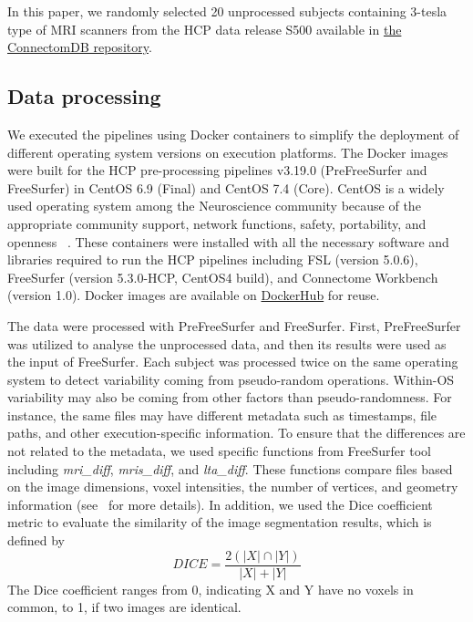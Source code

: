 \documentclass[a4paper,num-refs]{oup-contemporary}
\begin{document}
In this paper, we randomly selected 20 unprocessed subjects 
containing 3-tesla type of MRI scanners from the HCP data release S500 
available in \href{https://db.humanconnectome.org}{the ConnectomDB repository}. 


\subsection{Data processing}

We executed the pipelines using Docker containers to simplify the 
deployment of different operating system versions on execution 
platforms. 
The Docker images were built for the HCP pre-processing 
pipelines v3.19.0 (PreFreeSurfer and FreeSurfer) in 
CentOS 6.9 (Final) and CentOS 7.4 (Core). 
CentOS is a widely used operating system among the Neuroscience community because of 
the appropriate community support, network functions, safety, portability, and openness
~\cite{hanke2011neuroscience}.
These containers were installed with all the necessary software and libraries 
required to run the HCP pipelines including FSL (version 5.0.6), 
FreeSurfer (version 5.3.0-HCP, CentOS4 build), and Connectome Workbench (version 1.0).
Docker images are available on 
\href{https://hub.docker.com/r/bigdatalabteam/hcp-prefreesurfer/}{DockerHub}
for reuse.

The data were processed with PreFreeSurfer and FreeSurfer. 
First, PreFreeSurfer was utilized to analyse the unprocessed data, and then its 
results were used as the input of FreeSurfer.
Each subject was processed twice on the same operating system to detect
variability coming from pseudo-random operations. 
Within-OS variability may also be coming from other factors than pseudo-randomness. 
For instance, the same files may have different metadata such as timestamps, 
file paths, and other execution-specific information. 
To ensure that the differences are not related to the metadata, 
we used specific functions from FreeSurfer tool including 
\emph{mri\_diff}, \emph{mris\_diff}, and \emph{lta\_diff}.
These functions compare files based on the image dimensions, 
voxel intensities, the number of vertices, and geometry information
(see~\cite{fischl2012freesurfer} for more details). 
In addition, we used the Dice coefficient metric to evaluate the similarity of 
the image segmentation results, which is defined by
\[DICE=\frac{2(|X|\cap|Y|)}{|X|+|Y|}\]
The Dice coefficient ranges from 0, indicating X and Y have no voxels in common, to 1, if 
two images are identical. 
\end{document}
